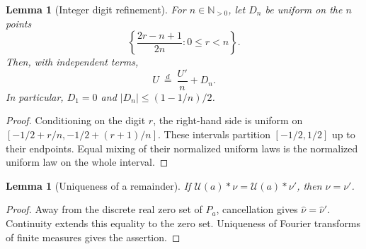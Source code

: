 \documentclass[11pt,letterpaper]{article}
\newtheorem{lemma}[theorem]{Lemma}
\theoremstyle{definition}
\theoremstyle{remark}
\newcommand{\Np}{\mathbb N_{>0}}
\newcommand{\Un}{\mathcal U}
\numberwithin{equation}{section}
\begin{document}
\begin{lemma}[Integer digit refinement]\label{lem:digits}
For $n\in\Np$, let $D_n$ be uniform on the $n$ points
\begin{equation}\label{eq:digits}
 \left\{\frac{2r-n+1}{2n}:0\le r<n\right\}.
\end{equation}
Then, with independent terms,
\begin{equation}\label{eq:refinement}
 U\ \stackrel{d}{=}\ \frac{U'}{n}+D_n.
\end{equation}
In particular, $D_1=0$ and $|D_n|\le(1-1/n)/2$.
\end{lemma}
\begin{proof}
Conditioning on the digit $r$, the right-hand side is uniform on
$[-1/2+r/n,-1/2+(r+1)/n]$. These intervals partition $[-1/2,1/2]$ up to their endpoints. Equal mixing of their normalized uniform laws is the normalized uniform law on the whole interval.
\end{proof}

\begin{lemma}[Uniqueness of a remainder]\label{lem:unique}
If $\Un(a)*\nu=\Un(a)*\nu'$, then $\nu=\nu'$.
\end{lemma}
\begin{proof}
Away from the discrete real zero set of $P_a$, cancellation gives $\widehat\nu=\widehat\nu'$. Continuity extends this equality to the zero set. Uniqueness of Fourier transforms of finite measures gives the assertion.
\end{proof}
\end{document}
